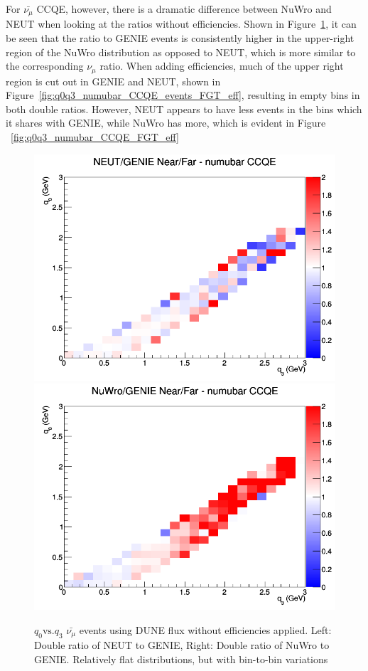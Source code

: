 \documentclass[12pt]{article}
\begin{document}
For $\bar{\nu_{\mu}}$ CCQE, however, there is a dramatic difference between NuWro and NEUT when looking at the ratios without efficiencies. Shown in Figure~\ref{fig:q0q3_numubar_CCQE_no_eff}, it can be seen that the ratio to GENIE events is consistently higher in the upper-right region of the NuWro distribution as opposed to NEUT, which is more similar to the corresponding $\nu_{\mu}$ ratio. When adding efficiencies, much of the upper right region is cut out in GENIE and NEUT, shown in Figure~\ref{fig:q0q3_numubar_CCQE_events_FGT_eff}, resulting in empty bins in both double ratios. However, NEUT appears to have less events in the bins which it shares with GENIE, while NuWro has more, which is evident in Figure ~\ref{fig:q0q3_numubar_CCQE_FGT_eff}
\begin{figure}[h]
\centering
{}
\includegraphics[width=\linewidth]{q0_q3/nominal/ratios/CCQE_NEUT_GENIE_numubar_NF_q3_q0.png}
\endminipage
{}
\includegraphics[width=\linewidth]{q0_q3/nominal/ratios/CCQE_NuWro_GENIE_numubar_NF_q3_q0.png}
\endminipage
\caption{$q_0 \textrm{vs.} q_3$ $\bar{\nu_{\mu}}$ events using DUNE flux without efficiencies applied. Left: Double ratio of NEUT to GENIE, Right: Double ratio of NuWro to GENIE. Relatively flat distributions, but with bin-to-bin variations}
\label{fig:q0q3_numubar_CCQE_no_eff}
\end{figure}
\end{document}
